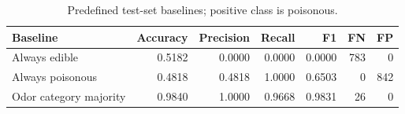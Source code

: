 \begin{table}[H]
\centering\small
\caption{Predefined test-set baselines; positive class is poisonous.}
\begin{tabular}{lrrrrrr}
\toprule
Baseline & Accuracy & Precision & Recall & F1 & FN & FP \\
\midrule
Always edible & 0.5182 & 0.0000 & 0.0000 & 0.0000 & 783 & 0 \\
Always poisonous & 0.4818 & 0.4818 & 1.0000 & 0.6503 & 0 & 842 \\
Odor category majority & 0.9840 & 1.0000 & 0.9668 & 0.9831 & 26 & 0 \\
\bottomrule
\end{tabular}
\end{table}
